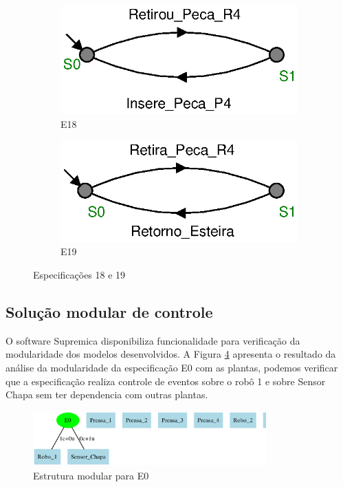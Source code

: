\begin{figure}[H]%
  \centering
  \begin{subfigure}{0.45\textwidth}
      \centering
      \includegraphics[width=\textwidth]{imagens/E18.eps}
      \caption{E18}
      \label{fig:e18}
  \end{subfigure}
  \hfill
  \begin{subfigure}{0.45\textwidth}
      \centering
      \includegraphics[width=\textwidth]{imagens/E19.eps}
      \caption{E19}
      \label{fig:e19}
  \end{subfigure}
  \caption{Especificações 18 e 19}
  \label{fig:e1819}
\end{figure}

\subsection{Solução modular de controle}
O software Supremica \cite{Supremica2020} disponibiliza funcionalidade para verificação da modularidade dos modelos desenvolvidos.
A Figura \ref{fig:modulare0} apresenta o resultado da análise da modularidade da especificação E0 com as plantas, podemos verificar que a especificação realiza controle de eventos sobre o robô 1 e sobre Sensor Chapa sem ter dependencia com outras plantas.

\begin{figure}[H]%
  \centering
  \includegraphics[width=0.8\textwidth]{imagens/modular_E0.eps}
  \caption{Estrutura modular para E0}\label{fig:modulare0}
\end{figure}

